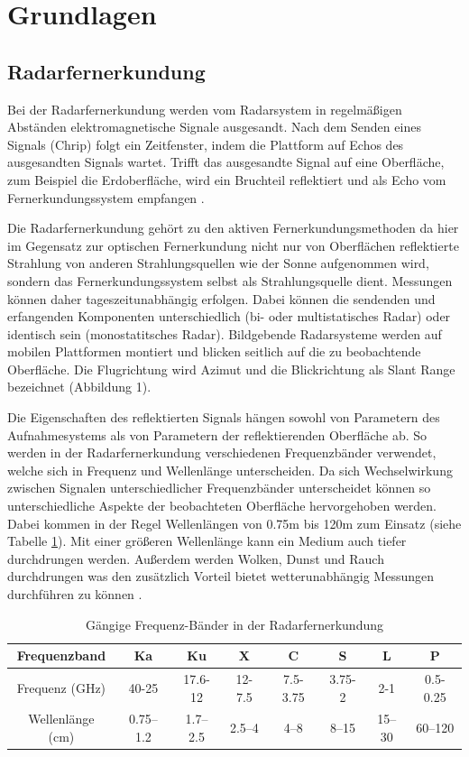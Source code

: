 \newpage
\restoregeometry
\section{Grundlagen}
\subsection{Radarfernerkundung}
Bei der Radarfernerkundung werden vom Radarsystem in regelmäßigen Abständen elektromagnetische Signale ausgesandt. Nach dem Senden eines Signals 
(Chrip) folgt ein Zeitfenster, indem die Plattform auf Echos des ausgesandten Signals wartet.
Trifft das ausgesandte Signal auf eine Oberfläche, zum Beispiel 
die Erdoberfläche, wird ein Bruchteil reflektiert und als Echo vom Fernerkundungssystem empfangen \cite{tutorial_on_sar}.

Die Radarfernerkundung gehört zu den aktiven Fernerkundungsmethoden da hier im Gegensatz zur optischen Fernerkundung nicht nur 
von Oberflächen reflektierte Strahlung von anderen Strahlungsquellen wie der Sonne aufgenommen wird, sondern das Fernerkundungssystem 
selbst als Strahlungsquelle dient. Messungen können daher tageszeitunabhängig erfolgen. Dabei können die sendenden und erfangenden Komponenten 
unterschiedlich (bi- oder multistatisches Radar) oder identisch sein (monostatitsches Radar). Bildgebende Radarsysteme werden auf mobilen Plattformen 
montiert und blicken seitlich auf die zu beobachtende Oberfläche. Die Flugrichtung wird Azimut und die Blickrichtung als Slant Range 
bezeichnet \cite{tutorial_on_sar} (Abbildung 1). 

Die Eigenschaften des reflektierten Signals hängen sowohl von Parametern des Aufnahmesystems als von Parametern der reflektierenden Oberfläche ab.
So werden in der Radarfernerkundung verschiedenen Frequenzbänder verwendet, welche sich in Frequenz und Wellenlänge unterscheiden. Da sich Wechselwirkung zwischen Signalen 
unterschiedlicher Frequenzbänder unterscheidet können so unterschiedliche Aspekte der beobachteten Oberfläche hervorgehoben werden. Dabei kommen in der Regel
Wellenlängen von 0.75m bis 120m zum Einsatz (siehe Tabelle \ref{frequenzbaender}).
Mit einer größeren Wellenlänge kann ein Medium auch tiefer durchdrungen werden. Außerdem werden Wolken, Dunst und Rauch durchdrungen was den zusätzlich Vorteil bietet
wetterunabhängig Messungen durchführen zu können \cite{einfuehrung_in_fernerkundung}.

\begin{table}[H]
    \caption{Gängige Frequenz-Bänder in der Radarfernerkundung \cite{tutorial_on_sar}}
    \centering
    \begin{tabular}{c|c c c c c c c } 
        Frequenzband & Ka & Ku & X & C & S & L & P\\ 
        \hline
        Frequenz (GHz) & 40-25 & 17.6-12 & 12-7.5 & 7.5-3.75 & 3.75-2 & 2-1 & 0.5-0.25\\ 
        Wellenlänge (cm) & 0.75–1.2 & 1.7–2.5 & 2.5–4 & 4–8 & 8–15 & 15–30 & 60–120\\ 
    \end{tabular}
    \label{frequenzbaender}
\end{table}

